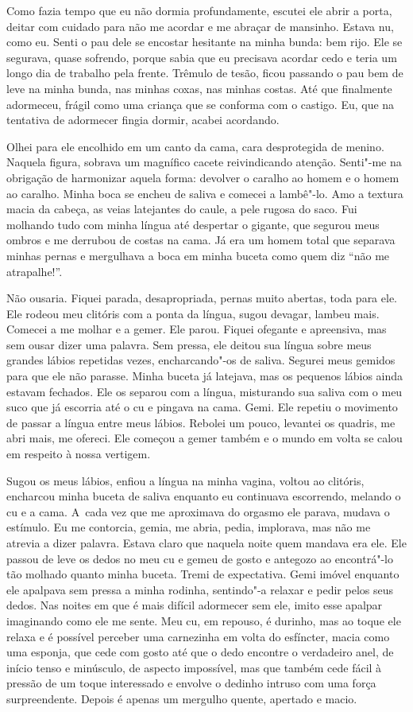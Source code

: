 Como fazia tempo que eu não dormia profundamente, escutei ele abrir a
porta, deitar com cuidado para não me acordar e me abraçar de mansinho.
Estava nu, como eu. Senti o pau dele se encostar hesitante na minha
bunda: bem rijo. Ele se segurava, quase sofrendo, porque sabia que eu
precisava acordar cedo e teria um longo dia de trabalho pela frente.
Trêmulo de tesão, ficou passando o pau bem de leve na minha bunda, nas
minhas coxas, nas minhas costas. Até que finalmente adormeceu, frágil
como uma criança que se conforma com o castigo. Eu, que na tentativa de
adormecer fingia dormir, acabei acordando.

Olhei para ele encolhido em um canto da cama, cara desprotegida de
menino. Naquela figura, sobrava um magnífico cacete reivindicando
atenção. Senti"-me na obrigação de harmonizar aquela forma: devolver o
caralho ao homem e o homem ao caralho. Minha boca se encheu de saliva e
comecei a lambê"-lo. Amo a textura macia da cabeça, as veias latejantes
do caule, a pele rugosa do saco. Fui molhando tudo com minha língua até
despertar o gigante, que segurou meus ombros e me derrubou de costas na
cama. Já era um homem total que separava minhas pernas e mergulhava a
boca em minha buceta como quem diz ``não me atrapalhe!''.

Não ousaria. Fiquei parada, desapropriada, pernas muito abertas, toda
para ele. Ele rodeou meu clitóris com a ponta da língua, sugou devagar,
lambeu mais. Comecei a me molhar e a gemer. Ele parou. Fiquei ofegante e
apreensiva, mas sem ousar dizer uma palavra. Sem pressa, ele deitou sua
língua sobre meus grandes lábios repetidas vezes, encharcando"-os de
saliva. Segurei meus gemidos para que ele não parasse. Minha buceta já
latejava, mas os pequenos lábios ainda estavam fechados. Ele os separou
com a língua, misturando sua saliva com o meu suco que já escorria até o
cu e pingava na cama. Gemi. Ele repetiu o movimento de passar a língua
entre meus lábios. Rebolei um pouco, levantei os quadris, me abri mais,
me ofereci. Ele começou a gemer também e o mundo em volta se calou em
respeito à nossa vertigem.

Sugou os meus lábios, enfiou a língua na minha vagina, voltou ao
clitóris, encharcou minha buceta de saliva enquanto eu continuava
escorrendo, melando o cu e a cama. A~cada vez que me aproximava do
orgasmo ele parava, mudava o estímulo. Eu me contorcia, gemia, me abria,
pedia, implorava, mas não me atrevia a dizer palavra. Estava claro que
naquela noite quem mandava era ele. Ele passou de leve os dedos no meu
cu e gemeu de gosto e antegozo ao encontrá"-lo tão molhado quanto minha
buceta. Tremi de expectativa. Gemi imóvel enquanto ele apalpava sem
pressa a minha rodinha, sentindo"-a relaxar e pedir pelos seus dedos. Nas
noites em que é mais difícil adormecer sem ele, imito esse apalpar
imaginando como ele me sente. Meu cu, em repouso, é durinho, mas ao
toque ele relaxa e é possível perceber uma carnezinha em volta do
esfíncter, macia como uma esponja, que cede com gosto até que o dedo
encontre o verdadeiro anel, de início tenso e minúsculo, de aspecto
impossível, mas que também cede fácil à pressão de um toque interessado
e envolve o dedinho intruso com uma força surpreendente. Depois é apenas
um mergulho quente, apertado e macio.

